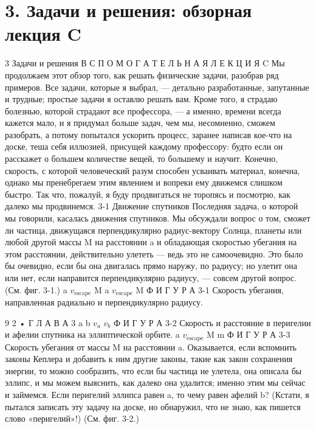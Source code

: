 \documentclass[10pt,oneside]{article}
\begin{document}
\section*{3. Задачи и решения: обзорная лекция C}
\label{tips-sec-11-3-задачи-и-решения-обзорная-лекция-c}
3 Задачи и решения В С П О М О Г А Т Е Л Ь Н А Я  Л Е К Ц И Я  C Мы продолжаем этот обзор того, как решать физические задачи, разобрав ряд примеров. Все задачи, которые я выбрал, --- детально разработанные, запутанные и трудные; простые задачи я оставлю решать вам. Кроме того, я страдаю болезнью, которой страдают все профессора, --- а именно, времени всегда кажется мало, и я придумал больше задач, чем мы, несомненно, сможем разобрать, а потому попытался ускорить процесс, заранее написав кое-что на доске, теша себя иллюзией, присущей каждому профессору: будто если он расскажет о большем количестве вещей, то большему и научит. Конечно, скорость, с которой человеческий разум способен усваивать материал, конечна, однако мы пренебрегаем этим явлением и вопреки ему движемся слишком быстро. Так что, пожалуй, я буду продвигаться не торопясь и посмотрю, как далеко мы продвинемся. 3-1 Движение спутников Последняя задача, о которой мы говорили, касалась движения спутников. Мы обсуждали вопрос о том, сможет ли частица, движущаяся перпендикулярно радиус-вектору Солнца, планеты или любой другой массы M на расстоянии a и обладающая скоростью убегания на этом расстоянии, действительно улететь --- ведь это не самоочевидно. Это было бы очевидно, если бы она двигалась прямо наружу, по радиусу; но улетит она или нет, если направится перпендикулярно радиусу, --- совсем другой вопрос. (См. фиг. 3-1.) a \(v_{\text{escape}}\) M a \(v_{\text{escape}}\) M Ф И Г У Р А  3-1 Скорость убегания, направленная радиально и перпендикулярно радиусу.\par

9 2 • Г Л А В А  3 a b \(v_a\) \(v_b\) Ф И Г У Р А  3-2 Скорость и расстояние в перигелии и афелии спутника на эллиптической орбите. a \(v_{\text{escape}}\) M m Ф И Г У Р А  3-3 Скорость убегания от массы M на расстоянии a. Оказывается, если вспомнить законы Кеплера и добавить к ним другие законы, такие как закон сохранения энергии, то можно сообразить, что если бы частица не улетела, она описала бы эллипс, и мы можем выяснить, как далеко она удалится; именно этим мы сейчас и займемся. Если перигелий эллипса равен a, то чему равен афелий b? (Кстати, я пытался записать эту задачу на доске, но обнаружил, что не знаю, как пишется слово «перигелий»!) (См. фиг. 3-2.)\par
\end{document}
